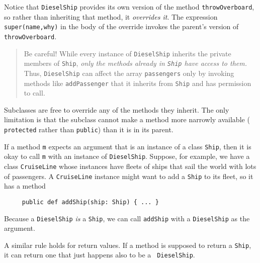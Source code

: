 Notice that {\tt DieselShip} provides its own
version of the method {\tt throw\-Over\-board}, so rather than inheriting that
method, it {\em overrides it}.  The expression {\tt super(name,why)} in the
body of the override invokes the parent's version of {\tt throw\-Over\-board}.
\begin{quote}
Be careful! While every instance of {\tt DieselShip} inherits the private members
of {\tt Ship}, {\em only the methods already in {\tt Ship} have access
to them.} Thus, {\tt DieselShip} can affect the array {\tt passengers} only by
invoking methods like {\tt addPassenger} that it inherits from {\tt Ship}
and has permission to call.
\end{quote}
Subclasses are free to override any of the methods they inherit.  The only
limitation is that the subclass cannot make a method more narrowly available
(\eg{} {\tt protected} rather than {\tt public}) than it is in its parent.

If a method {\tt m} expects an argument that is an instance of a class {\tt Ship},
then it is okay to call {\tt m} with an
instance of {\tt DieselShip}.
Suppose, for example, we have a class {\tt CruiseLine} whose instances have
fleets of ships that sail the world with lots of passengers.  A {\tt CruiseLine}
instance might want to add a {\tt Ship} to its fleet, so it has a method
\begin{verbatim}
     public def addShip(ship: Ship) { ... }
\end{verbatim}
Because a {\tt DieselShip} {\em is} a {\tt Ship}, we can call {\tt addShip}
with a {\tt DieselShip} as the argument.

A similar rule holds for return values.  If a method is supposed to return a 
{\tt Ship}, it can return one that just happens also to be a {\tt
DieselShip}.

